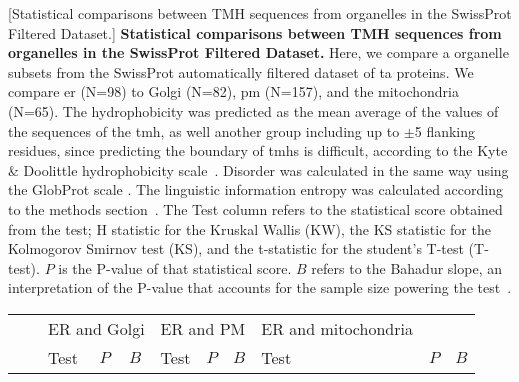 	\begin{table}[htbp]
	\centering
	[Statistical comparisons between TMH sequences from organelles in the SwissProt Filtered Dataset.]
	{\textbf{Statistical comparisons between TMH sequences from organelles in the SwissProt Filtered Dataset.}
	Here, we compare a organelle subsets from the SwissProt automatically filtered dataset of \gls{ta} proteins.
	We compare \gls{er} (N=98) to Golgi (N=82), \gls{pm} (N=157), and the mitochondria (N=65).
	The hydrophobicity was predicted as the mean average of the values of the sequences of the \gls{tmh}, as well another group including up to $\pm$5 flanking residues, since predicting the boundary of \gls{tmh}s is difficult, according to the Kyte \& Doolittle hydrophobicity scale~\cite{Kyte1982}.
	Disorder was calculated in the same way using the GlobProt scale \cite{Linding2003}.
	The linguistic information entropy was calculated according to the methods section~\cite{Shannon1948}.
	The Test column refers to the statistical score obtained from the test; H statistic for the Kruskal Wallis (KW), the KS statistic for the Kolmogorov Smirnov test (KS), and the t-statistic for the student's T-test (T-test).
	$P$ is the P-value of that statistical score.
	$B$ refers to the Bahadur slope, an interpretation of the P-value that accounts for the sample size powering the test~\cite{Bahadur1967, Bahadur1971}.}
		\tiny

		 \begin{tabular}{clccccccccc}
								&       & \multicolumn{3}{c}{ER and Golgi} & \multicolumn{3}{c}{ER and PM} & \multicolumn{1}{l}{ER and mitochondria} &       &  \\
								&       & \multicolumn{1}{l}{Test} & \multicolumn{1}{l}{$P$} & \multicolumn{1}{l}{$B$} & \multicolumn{1}{l}{Test} & \multicolumn{1}{l}{$P$} & \multicolumn{1}{l}{$B$} & \multicolumn{1}{l}{Test} & \multicolumn{1}{l}{$P$} & \multicolumn{1}{l}{$B$} \\


\end{tabular}
\end{table}
